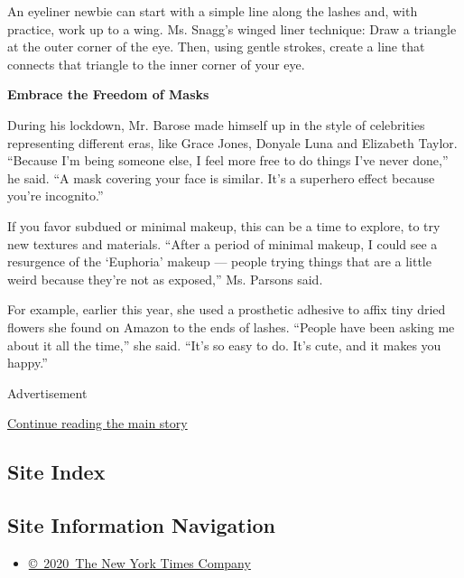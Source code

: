 An eyeliner newbie can start with a simple line along the lashes and,
with practice, work up to a wing. Ms. Snagg's winged liner technique:
Draw a triangle at the outer corner of the eye. Then, using gentle
strokes, create a line that connects that triangle to the inner corner
of your eye.

\textbf{Embrace the Freedom of Masks}

During his lockdown, Mr. Barose made himself up in the style of
celebrities representing different eras, like Grace Jones, Donyale Luna
and Elizabeth Taylor. ``Because I'm being someone else, I feel more free
to do things I've never done,'' he said. ``A mask covering your face is
similar. It's a superhero effect because you're incognito.''

If you favor subdued or minimal makeup, this can be a time to explore,
to try new textures and materials. ``After a period of minimal makeup, I
could see a resurgence of the `Euphoria' makeup --- people trying things
that are a little weird because they're not as exposed,'' Ms. Parsons
said.

For example, earlier this year, she used a prosthetic adhesive to affix
tiny dried flowers she found on Amazon to the ends of lashes. ``People
have been asking me about it all the time,'' she said. ``It's so easy to
do. It's cute, and it makes you happy.''

Advertisement

\protect\hyperlink{after-bottom}{Continue reading the main story}

\hypertarget{site-index}{%
\subsection{Site Index}\label{site-index}}

\hypertarget{site-information-navigation}{%
\subsection{Site Information
Navigation}\label{site-information-navigation}}

\begin{itemize}
\tightlist
\item
  \href{https://help.nytimes3xbfgragh.onion/hc/en-us/articles/115014792127-Copyright-notice}{©~2020~The
  New York Times Company}
\end{itemize}

